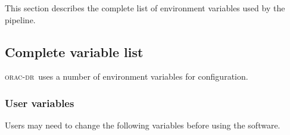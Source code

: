\documentclass[twoside,11pt]{article}
\renewcommand{\_}{\texttt{\symbol{95}}}
\newcommand{\oracdr}{\textsc{orac-dr}}
\begin{document}
This section describes the complete list of environment variables
used by the pipeline.

\subsection*{Complete variable list\label{Shell_Variables_Complete_variable_list}}

\oracdr\ uses a number of environment variables for configuration.

\subsubsection*{User variables\label{Shell_Variables_User_variables}}

Users may need to change the following variables before using the
software.
\end{document}
